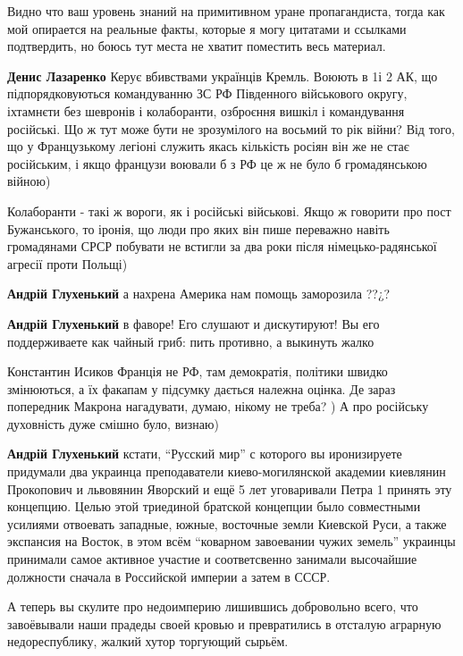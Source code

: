\begin{itemize}
\begin{itemize}
Видно что ваш уровень знаний на примитивном уране пропагандиста, тогда как мой
опирается на реальные факты, которые я могу цитатами и ссылками подтвердить,
но боюсь тут места не хватит поместить весь материал.


\textbf{Денис Лазаренко} Керує вбивствами українців Кремль. Воюють в 1і 2 АК,
що підпорядковуються командуванню ЗС РФ Південного військового округу,
іхтамнєти без шевронів і колаборанти, озброєння вишкіл і командування
російські. Що ж тут може бути не зрозумілого на восьмий то рік війни? Від того,
що у Французькому легіоні служить якась кількість росіян він же не стає
російським, і якщо французи воювали б з РФ це ж не було б громадянською війною)

Колаборанти - такі ж вороги, як і російські військові. Якщо ж говорити про пост
Бужанського, то іронія, що люди про яких він пише переважно навіть громадянами
СРСР побувати не встигли за два роки після німецько-радянської агресії проти
Польщі)

\textbf{Андрій Глухенький} а нахрена Америка нам помощь заморозила ??¿?

\textbf{Андрій Глухенький} в фаворе! Его слушают и дискутируют! Вы его поддерживаете как
чайный гриб: пить противно, а выкинуть жалко


Константин Исиков Франція не РФ, там демократія, політики швидко змінюються, а їх факапам у підсумку дається належна оцінка. Де зараз попередник Макрона нагадувати, думаю, нікому не треба? ) А про російську духовність дуже смішно було, визнаю)


\textbf{Андрій Глухенький} кстати, \enquote{Русский мир} с которого вы
иронизируете придумали два украинца преподаватели киево-могилянской академии
киевлянин Прокопович и львовянин Яворский и ещё 5 лет уговаривали Петра 1
принять эту концепцию. Целью этой триединой братской концепции было совместными
усилиями отвоевать западные, южные, восточные земли Киевской Руси, а также
экспансия на Восток, в этом всём \enquote{коварном завоевании чужих земель}
украинцы принимали самое активное участие и соответсвенно занимали высочайшие
должности сначала в Российской империи а затем в СССР.

А теперь вы скулите про недоимперию лишившись добровольно всего, что
завоёвывали наши прадеды своей кровью и превратились в отсталую аграрную
недореспублику, жалкий хутор торгующий сырьём.


\end{itemize}
\end{itemize}
